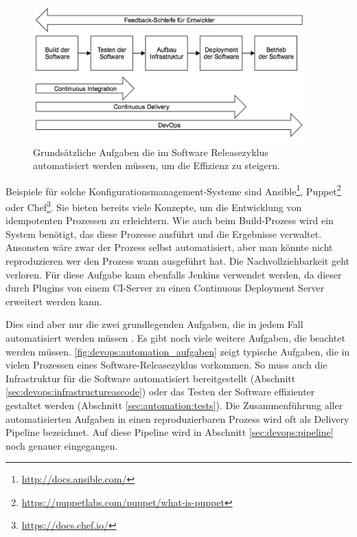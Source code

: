 \begin{figure}[ht]
	\centering
	\includegraphics[width=0.95\textwidth]{img/auto_aufgaben.png}
	\caption[Grundlegende zu automatisierende Aufgaben]{Grundsätzliche Aufgaben die im Software Releasezyklus automatisiert werden müssen, um die Effizienz zu steigern.}
	\label{fig:devops:automation_aufgaben}
\end{figure} 

Beispiele für solche Konfigurationsmanagement-Systeme sind Ansible\footnote{\url{http://docs.ansible.com/}}, Puppet\footnote{\url{https://puppetlabs.com/puppet/what-is-puppet}} oder Chef\footnote{\url{https://docs.chef.io/}}. Sie bieten bereits viele Konzepte, um die Entwicklung von idempotenten Prozessen zu erleichtern. Wie auch beim Build-Prozess wird ein System benötigt, das diese Prozesse ausführt und die Ergebnisse verwaltet. Ansonsten wäre zwar der Prozess selbst automatisiert, aber man könnte nicht reproduzieren wer den Prozess wann ausgeführt hat. Die Nachvollziehbarkeit geht verloren. Für diese Aufgabe kann ebenfalls Jenkins verwendet werden, da dieser durch Plugins von einem CI-Server zu einen Continuous Deployment Server erweitert werden kann.

Dies sind aber nur die zwei grundlegenden Aufgaben, die in jedem Fall automatisiert werden müssen \cite{humble2010, wolff2014}. Es gibt noch viele weitere Aufgaben, die beachtet werden müssen. \autoref{fig:devops:automation_aufgaben} zeigt typische Aufgaben, die in vielen Prozessen eines Software-Releasezyklus vorkommen. So muss auch die Infrastruktur für die Software automatisiert bereitgestellt (Abschnitt \ref{sec:devops:infrastructureascode}) oder das Testen der Software effizienter gestaltet werden (Abschnitt \ref{sec:automation:tests}). Die Zusammenführung aller automatisierten Aufgaben in einen reproduzierbaren Prozess wird oft als Delivery Pipeline bezeichnet. Auf diese Pipeline wird in Abschnitt \ref{sec:devops:pipeline} noch genauer eingegangen.

